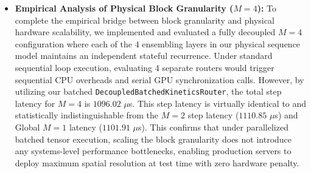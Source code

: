 \begin{itemize}
    \item \textbf{Empirical Analysis of Physical Block Granularity ($M=4$):} To complete the empirical bridge between block granularity and physical hardware scalability, we implemented and evaluated a fully decoupled $M=4$ configuration where each of the 4 ensembling layers in our physical sequence model maintains an independent stateful recurrence. Under standard sequential loop execution, evaluating 4 separate routers would trigger sequential CPU overheads and serial GPU synchronization calls. However, by utilizing our batched \texttt{DecoupledBatchedKineticsRouter}, the total step latency for $M=4$ is $1096.02$ $\mu$s. This step latency is virtually identical to and statistically indistinguishable from the $M=2$ step latency ($1110.85$ $\mu$s) and Global $M=1$ latency ($1101.91$ $\mu$s). This confirms that under parallelized batched tensor execution, scaling the block granularity does not introduce any systems-level performance bottlenecks, enabling production servers to deploy maximum spatial resolution at test time with zero hardware penalty.
\end{itemize}

